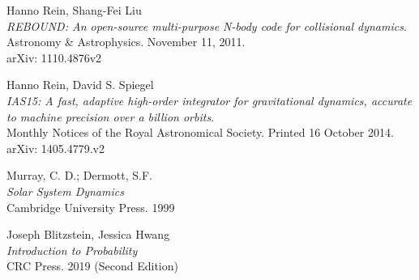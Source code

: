 \newpage
\begin{thebibliography}{9}

Hanno Rein, Shang-Fei Liu\\
\textit{REBOUND: An open-source multi-purpose N-body code for collisional dynamics}.\\
Astronomy \& Astrophysics.  November 11, 2011.\\
arXiv: 1110.4876v2

Hanno Rein, David S. Spiegel\\
\textit{IAS15: A fast, adaptive high-order integrator for gravitational dynamics, accurate to machine precision over a billion orbits}.\\
Monthly Notices of the Royal Astronomical Society.  Printed 16 October 2014.\\
arXiv: 1405.4779.v2

Murray, C. D.; Dermott, S.F. \\
\textit{Solar System Dynamics}\\
Cambridge University Press. 1999

Joseph Blitzstein, Jessica Hwang\\
\textit{Introduction to Probability}\\
CRC Press.  2019 (Second Edition)

\end{thebibliography}